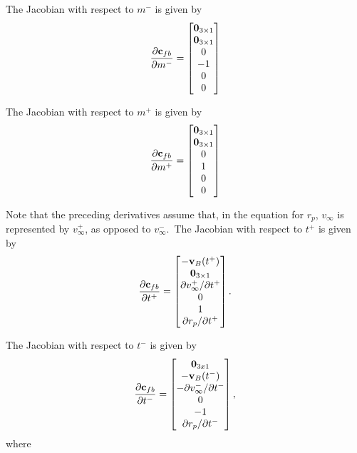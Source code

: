 The Jacobian with respect to $m^-$ is given by
\begin{equation}
\frac{\partial \mathbf{c}_{fb}}{\partial m^-} = \begin{bmatrix}
\mathbf{0}_{3 \times 1}\\\mathbf{0}_{3 \times 1}\\0\\-1\\0\\0
\end{bmatrix}
\end{equation}


The Jacobian with respect to $m^+$ is given by
\begin{equation}
\frac{\partial \mathbf{c}_{fb}}{\partial m^+} = \begin{bmatrix}
\mathbf{0}_{3 \times 1}\\\mathbf{0}_{3 \times 1}\\0\\1\\0\\0
\end{bmatrix}
\end{equation}

Note that the preceding derivatives assume that, in the equation for $r_p$, $v_{\infty}$ is represented by $v_{\infty}^+$, as opposed to $v_{\infty}^-$.~The Jacobian with respect to $t^+$ is given by
\begin{equation}
\frac{\partial \mathbf{c}_{fb}}{\partial t^+} =
\begin{bmatrix}
   -\mathbf{v}_{B}(t^+)  \\
   \mathbf{0}_{3 \times 1}   \\
   \partial v_{\infty}^+ / \partial t^+ \\
   0  \\
   1 \\
   \partial r_p / \partial t^+ \\
\end{bmatrix}.
\end{equation}

The Jacobian with respect to $t^-$ is given by
\begin{equation}
\frac{\partial \mathbf{c}_{fb}}{\partial t^-} =
\begin{bmatrix}
   \mathbf{0}_{3x1}  \\
    -\mathbf{v}_{B}(t^-)  \\
   - \partial v_{\infty}^- / \partial t^- \\
   0  \\
   -1 \\
   \partial r_p / \partial t^- \\
\end{bmatrix},
\end{equation}
%
where

